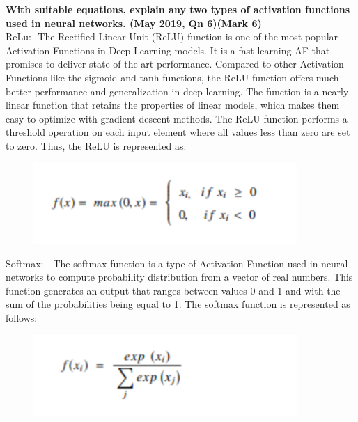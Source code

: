 
\textbf{\textcolor{LightMagenta}{With suitable equations, explain any two types of activation functions used in neural networks. (May 2019, Qn 6)\hfill (Mark 6)}} \\[5pt]
ReLu:-
The Rectified Linear Unit (ReLU) function is one of the most popular Activation Functions in Deep Learning models. It is a fast-learning AF that promises to deliver state-of-the-art performance. Compared to other Activation Functions like the sigmoid and tanh functions, the ReLU function offers much better performance and generalization in deep learning. The function is a nearly linear function that retains the properties of linear models, which makes them easy to optimize with gradient-descent methods. The ReLU function performs a threshold operation on each input element where all values less than zero are set to zero. Thus, the ReLU is represented as:
\begin{figure}[htp]
    \centering
    \includegraphics[width=10cm]{Images/A41_img1.png}
 \end{figure}

Softmax: - 
The softmax function is a type of Activation Function used in neural networks to compute probability distribution from a vector of real numbers. This function generates an output that ranges between values 0 and 1 and with the sum of the probabilities being equal to 1. The softmax function is represented as follows:
\begin{figure}[htp]
    \centering
    \includegraphics[width=10cm]{Images/A41_img2.png}
 \end{figure}